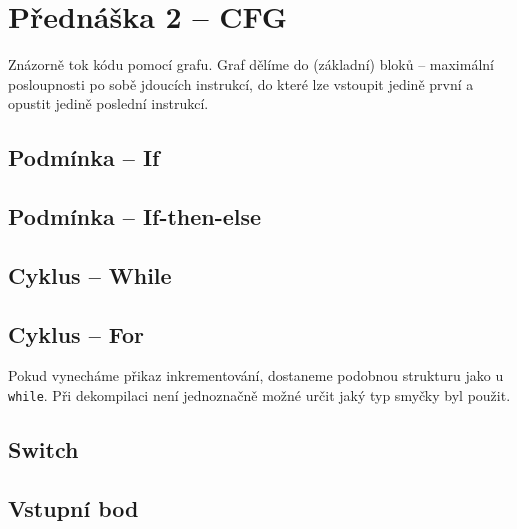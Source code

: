 \section{Přednáška 2 -- CFG}

Znázorně tok kódu pomocí grafu.
Graf dělíme do (základní) bloků -- maximální posloupnosti po sobě jdoucích instrukcí, do které lze vstoupit jedině první a opustit jedině poslední instrukcí.

\subsection*{Podmínka -- If}


\subsection*{Podmínka -- If-then-else}


\subsection*{Cyklus -- While}


\subsection*{Cyklus -- For}


Pokud vynecháme přikaz inkrementování, dostaneme podobnou strukturu jako u \texttt{while}.
Při dekompilaci není jednoznačně možné určit jaký typ smyčky byl použit.

\subsection*{Switch}


\subsection*{Vstupní bod}


